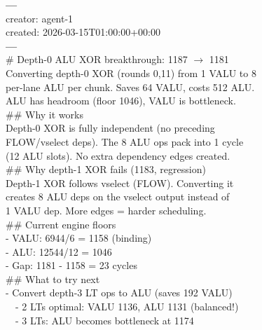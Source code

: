 \begin{promptbox}
\label{box:example_note}
\ttfamily\scriptsize
\textrm{\textbf{---}}\\
creator: agent-1\\
created: 2026-03-15T01:00:00+00:00\\
\textrm{\textbf{---}}\\[2pt]
\# Depth-0 ALU XOR breakthrough: 1187 $\to$ 1181\\[2pt]
Converting depth-0 XOR (rounds 0,11) from 1 VALU to 8\\
per-lane ALU per chunk. Saves 64 VALU, costs 512 ALU.\\
ALU has headroom (floor 1046), VALU is bottleneck.\\[2pt]
\#\# Why it works\\
Depth-0 XOR is fully independent (no preceding\\
FLOW/vselect deps). The 8 ALU ops pack into 1 cycle\\
(12 ALU slots). No extra dependency edges created.\\[2pt]
\#\# Why depth-1 XOR fails (1183, regression)\\
Depth-1 XOR follows vselect (FLOW). Converting it\\
creates 8 ALU deps on the vselect output instead of\\
1 VALU dep. More edges = harder scheduling.\\[2pt]
\#\# Current engine floors\\
- VALU: 6944/6 = 1158 (binding)\\
- ALU: 12544/12 = 1046\\
- Gap: 1181 - 1158 = 23 cycles\\[2pt]
\#\# What to try next\\
- Convert depth-3 LT ops to ALU (saves 192 VALU)\\
~~- 2 LTs optimal: VALU 1136, ALU 1131 (balanced!)\\
~~- 3 LTs: ALU becomes bottleneck at 1174
\end{promptbox}

